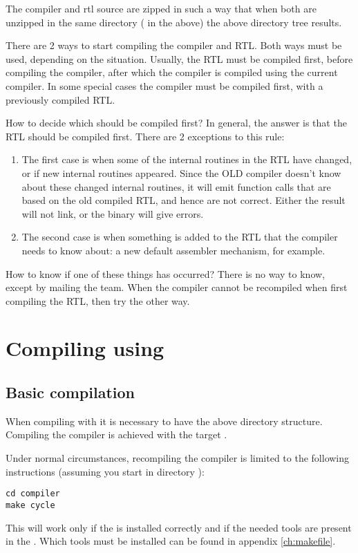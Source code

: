 The compiler and rtl source are zipped in such a way that when both are
unzipped in the same directory ( in the above) the above
directory tree results.

There are 2 ways to start compiling the compiler and RTL. Both ways must be
used, depending on the situation. Usually, the RTL must be compiled first,
before compiling the compiler, after which the compiler is compiled using
the current compiler. In some special cases the compiler must be compiled
first, with a previously compiled RTL.

How to decide which should be compiled first? In general, the answer is that
the RTL should be compiled first. There are 2 exceptions to this rule:
\begin{enumerate}
\item The first case is when some of the internal routines in the RTL
have changed, or if new internal routines appeared. Since the OLD compiler
doesn't know about these changed internal routines, it will emit function
calls that are based on the old compiled RTL, and hence are not correct.
Either the result will not link, or the binary will give errors.
\item The second case is when something is added to the RTL that the
compiler needs to know about: a new default assembler mechanism, for
example.
\end{enumerate}
How to know if one of these things has occurred? There is no way to know,
except by mailing the \fpc team. When the compiler cannot be recompiled
when first compiling the RTL, then try the other way.

\section{Compiling using }

\subsection{Basic compilation}

When compiling with  it is necessary to have the above directory
structure. Compiling the compiler is achieved with the target .

Under normal circumstances, recompiling the compiler is limited to the
following instructions (assuming you start in directory ):
\begin{verbatim}
cd compiler
make cycle
\end{verbatim}
This will work only if the  is installed correctly and
if the needed tools are present in the . Which tools must be
installed can be found in appendix \ref{ch:makefile}.

